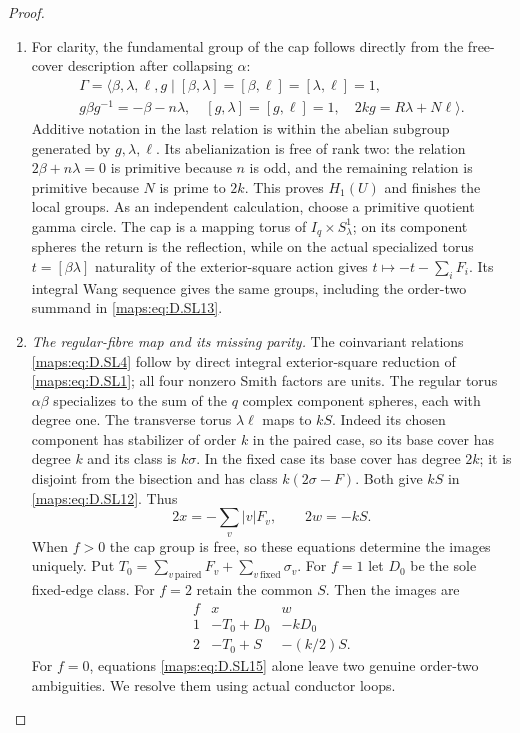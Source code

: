 \begin{proof}
\begin{enumerate}[label=\arabic*.,leftmargin=*]
\item For clarity, the fundamental group of the
cap follows directly from the free-cover
description after collapsing $\alpha$:
\[
\begin{gathered}
 \Gamma=\langle\beta,\lambda,\ell,g\mid
 [\beta,\lambda]=[\beta,\ell]=[\lambda,\ell]=1,\\
 g\beta g^{-1}=-\beta-n\lambda,\quad
 [g,\lambda]=[g,\ell]=1,\quad
                    2kg=R\lambda+N\ell\rangle .
\end{gathered}                                             \tag{D.SL14}\label{maps:eq:D.SL14}
\]
Additive notation in the last relation is
within the abelian subgroup generated by
$g,\lambda,\ell$. Its abelianization is free
of rank two: the relation $2\beta+n\lambda=0$
is primitive because $n$ is odd, and the
remaining relation is primitive because
$N$ is prime to $2k$. This proves $H_1(U)$
and finishes the local groups. As an
independent calculation, choose a primitive
quotient gamma circle. The cap is a mapping
torus of $I_q\times S^1_\lambda$; on its
component spheres the return is the
reflection, while on the actual specialized
torus $t=[\beta\lambda]$ naturality of the
exterior-square action gives
$t\mapsto-t-\sum_iF_i$. Its integral Wang
sequence gives the same groups, including
the order-two summand in \eqref{maps:eq:D.SL13}.

\item \emph{The regular-fibre map and its missing parity.}
The coinvariant relations \eqref{maps:eq:D.SL4} follow
by direct integral exterior-square reduction
of \eqref{maps:eq:D.SL1}; all four nonzero Smith factors
are units. The regular torus $\alpha\beta$
specializes to the sum of the $q$ complex
component spheres, each with degree one.
The transverse torus $\lambda\ell$ maps
to $kS$. Indeed its chosen component has
stabilizer of order $k$ in the paired case,
so its base cover has degree $k$ and its
class is $k\sigma$. In the fixed case its
base cover has degree $2k$; it is disjoint
from the bisection and has class
$k(2\sigma-F)$. Both give $kS$ in \eqref{maps:eq:D.SL12}.
Thus
\[
        2x=-\sum_v|v|F_v,\qquad 2w=-kS.                  \tag{D.SL15}\label{maps:eq:D.SL15}
\]
When $f>0$ the cap group is free, so these
equations determine the images uniquely.
Put
$T_0=\sum_{v\,\mathrm{paired}}F_v+
       \sum_{v\,\mathrm{fixed}}\sigma_v$.
For $f=1$ let $D_0$ be the sole fixed-edge
class. For $f=2$ retain the common $S$.
Then the images are
\[
\begin{array}{c|c|c}
 f&x&w\\\hline
1&-T_0+D_0&-kD_0\\
2&-T_0+S&-(k/2)S.
\end{array}                                               \tag{D.SL16}\label{maps:eq:D.SL16}
\]
For $f=0$, equations \eqref{maps:eq:D.SL15} alone leave
two genuine order-two ambiguities. We
resolve them using actual conductor loops.


\end{enumerate}
\end{proof}
